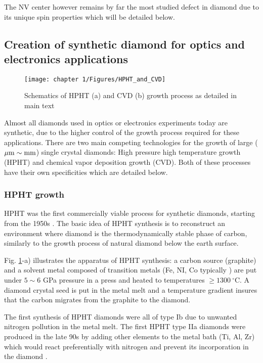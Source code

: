 \documentclass[a4paper, 11pt]{report}
\begin{document}
The NV center however remains by far the most studied defect in diamond due to its unique spin properties which will be detailed below.

\subsection{Creation of synthetic diamond for optics and electronics applications}
\begin{figure}[h!]
\centering
\texttt{[image: chapter 1/Figures/HPHT\_and\_CVD]}
\caption{Schematics of HPHT (a) and CVD (b) growth process as detailed in main text}
\label{HPHT and CVD}
\end{figure}

Almost all diamonds used in optics or electronics experiments today are synthetic, due to the higher control of the growth process required for these applications. There are two main competing technologies for the growth of large ($\mu \rm{m} \sim \rm{mm}$) single crystal diamonds: High pressure high temperature growth (HPHT) and chemical vapor deposition growth (CVD). Both of these processes have their own specificities which are detailed below.

\subsubsection{HPHT growth}

HPHT was the first commercially viable process for synthetic diamonds, starting from the 1950s \citep{barnard2000diamond, bundy1955man}. The basic idea of HPHT synthesis is to reconstruct an environment where diamond is the thermodynamically stable phase of carbon, similarly to the growth process of natural diamond below the earth surface. 

Fig. \ref{HPHT and CVD}-a) illustrates the apparatus of HPHT synthesis: a carbon source (graphite) and a solvent metal composed of transition metals (Fe, NI, Co typically \citep{bundy1963direct}) are put under $5 \sim 6$ GPa pressure in a press and heated to temperatures $\geq 1300\ ^\circ$C. A diamond crystal seed is put in the metal melt and a temperature gradient insures that the carbon migrates from the graphite to the diamond.

The first synthesis of HPHT diamonds were all of type Ib due to unwanted nitrogen pollution in the metal melt. The first HPHT type IIa diamonds were produced in the late 90s by adding other elements to the metal bath (Ti, Al, Zr) which would react preferentially with nitrogen and prevent its incorporation in the diamond \citep{burns1999growth, sumiya2002growth}.
\end{document}
